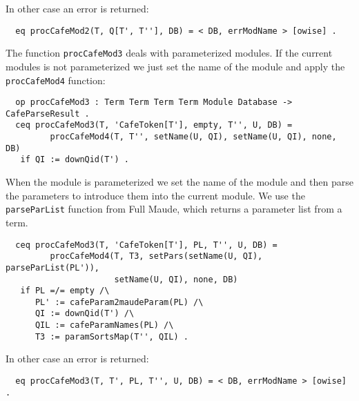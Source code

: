 In other case an error is returned:

{\codesize
\begin{verbatim}
  eq procCafeMod2(T, Q[T', T''], DB) = < DB, errModName > [owise] .
\end{verbatim}
}

The function \verb"procCafeMod3" deals with parameterized modules. If the current
modules is not parameterized we just set the name of the module and apply the
\texttt{procCafeMod4} function:

{\codesize
\begin{verbatim}
  op procCafeMod3 : Term Term Term Term Module Database -> CafeParseResult .
  ceq procCafeMod3(T, 'CafeToken[T'], empty, T'', U, DB) =
         procCafeMod4(T, T'', setName(U, QI), setName(U, QI), none, DB)
   if QI := downQid(T') .
\end{verbatim}
}

When the module is parameterized we set the name of the module and then parse
the parameters to introduce them into the current module.
We use the \texttt{parseParList} function from Full Maude, which returns a
parameter list from a term.

{\codesize
\begin{verbatim}
  ceq procCafeMod3(T, 'CafeToken[T'], PL, T'', U, DB) =
         procCafeMod4(T, T3, setPars(setName(U, QI), parseParList(PL')),
                      setName(U, QI), none, DB)
   if PL =/= empty /\
      PL' := cafeParam2maudeParam(PL) /\
      QI := downQid(T') /\
      QIL := cafeParamNames(PL) /\
      T3 := paramSortsMap(T'', QIL) .
\end{verbatim}
}

In other case an error is returned:

{\codesize
\begin{verbatim}
  eq procCafeMod3(T, T', PL, T'', U, DB) = < DB, errModName > [owise] .
\end{verbatim}
}

